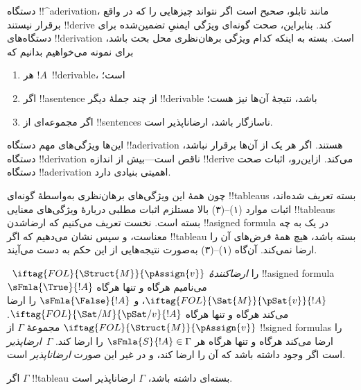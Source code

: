 \documentclass[../../../include/open-logic-section]{subfiles}
\begin{document}
      {}
      {}


\begin{explain}
دستگاه !!^a{derivation}، مانند تابلو،
\emph{صحیح} است اگر نتواند چیزهایی را که در واقع برقرار نیستند
!!{derive} کند. بنابراین، صحت گونه‌ای ویژگی ایمنیِ تضمین‌شده برای
دستگاه‌های !!{derivation} است. بسته به اینکه کدام ویژگی برهان‌نظری محل بحث
باشد، برای نمونه می‌خواهیم بدانیم که
\begin{enumerate}
\item هر $!A$~!!{derivable}،
 است؛
\item اگر !!a{sentence} از چند جملهٔ دیگر !!{derivable} باشد، نتیجهٔ
  آن‌ها نیز هست؛
\item اگر مجموعه‌ای از !!{sentence}s ناسازگار باشد، ارضاناپذیر است.
\end{enumerate}
این‌ها ویژگی‌های مهم دستگاه !!a{derivation} هستند. اگر هر یک از آن‌ها
برقرار نباشد، دستگاه !!{derivation} ناقص است---بیش از اندازه !!{derive}
می‌کند. ازاین‌رو، اثبات صحت دستگاه !!a{derivation} اهمیتی بنیادی دارد.

چون همهٔ این ویژگی‌های برهان‌نظری به‌واسطهٔ گونه‌ای !!{tableau}s بسته
تعریف شده‌اند، اثبات موارد (۱)--(۳) بالا مستلزم اثبات مطلبی دربارهٔ
ویژگی‌های معنایی !!{tableau}s بسته است. نخست تعریف می‌کنیم که ارضاشدن
!!a{signed formula} در یک  به چه معناست،
و سپس نشان می‌دهیم که اگر !!{tableau} بسته باشد، هیچ
 همهٔ فرض‌های آن را ارضا نمی‌کند.
آن‌گاه (۱)--(۳) به‌صورت نتیجه‌هایی از این حکم به دست می‌آیند.
\end{explain}

\begin{defn}
~$\iftag{FOL}{\Struct{M}}{\pAssign{v}}$
را \emph{ارضا‌کنندهٔ} !!a{signed formula}~$\sFmla{\True}{!A}$ می‌نامیم هرگاه و تنها هرگاه
$\iftag{FOL}{\Sat{M}}{\pSat{v}}{!A}$، و
$\sFmla{\False}{!A}$ را ارضا می‌کند هرگاه و تنها هرگاه
$\iftag{FOL}{\Sat/{M}}{\pSat/{v}}{!A}$.
$\iftag{FOL}{\Struct{M}}{\pAssign{v}}$ مجموعهٔ
$\Gamma$ از !!{signed formula}s را ارضا می‌کند هرگاه و تنها هرگاه هر
$\sFmla{S}{!A} \in \Gamma$ را ارضا کند. $\Gamma$~\emph{ارضاپذیر} است
اگر  وجود داشته باشد که آن
را ارضا کند، و در غیر این صورت \emph{ارضاناپذیر} است.
\end{defn}

\begin{thm}[صحت]
  اگر $\Gamma$ !!{tableau} بسته‌ای داشته باشد، $\Gamma$ ارضاناپذیر است.
\end{thm}
\end{document}
